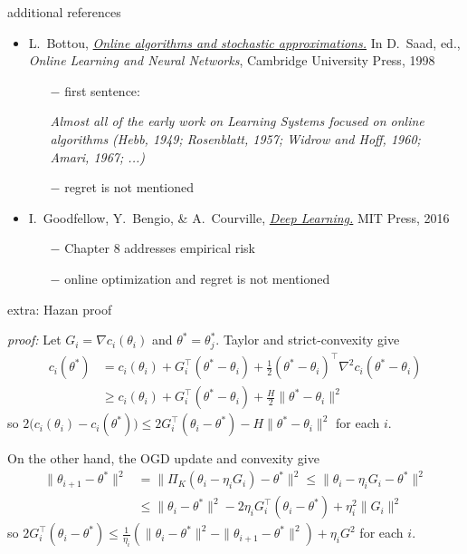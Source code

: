 \documentclass[xcolor={svgnames},
               hyperref={colorlinks,citecolor=DeepPink4,linkcolor=FireBrick,urlcolor=Maroon}]
               {beamer}
\newcommand{\grad}{\nabla}
\newcommand{\ds}{\displaystyle}
\begin{document}
\begin{frame}{additional references}

\begin{itemize}
\footnotesize
\item L.~Bottou, \href{http://leon.bottou.org/papers/bottou-98x}{\emph{Online algorithms and stochastic approximations.}}  In D.~Saad, ed., \emph{Online Learning and Neural Networks}, Cambridge University Press, 1998
    \begin{itemize}
    \scriptsize
    \item[$-$] first sentence:

\emph{Almost all of the early work on Learning Systems focused on online algorithms (Hebb, 1949; Rosenblatt, 1957; Widrow and Hoff, 1960; Amari, 1967; ...)}

    \item[$-$] regret is not mentioned
    \end{itemize}
\item I.~Goodfellow, Y.~Bengio, \& A.~Courville, \href{https://www.deeplearningbook.org/}{\emph{Deep Learning.}} MIT Press, 2016
    \begin{itemize}
    \scriptsize
    \item[$-$] Chapter 8 addresses empirical risk
    \item[$-$] online optimization and regret is not mentioned
    \end{itemize}
\end{itemize}
\end{frame}


\begin{frame}{extra: Hazan proof}

\noindent \emph{proof:}  Let $G_i = \grad c_i(\theta_i)$ and $\theta^*=\theta_j^*$.  Taylor and strict-convexity give
\begin{align*}
c_i(\theta^*) &= c_i(\theta_i) + G_i^\top (\theta^* - \theta_i) + \frac{1}{2} (\theta^* - \theta_i)^\top \grad^2 c_i (\theta^* - \theta_i) \\
    &\ge c_i(\theta_i) + G_i^\top (\theta^* - \theta_i) + \frac{H}{2} \|\theta^* - \theta_i\|^2
\end{align*}
so \quad $\ds 2 \big(c_i(\theta_i) - c_i(\theta^*)\big) \le 2 G_i^\top (\theta_i - \theta^*) - H \|\theta^* - \theta_i\|^2$ \quad for each $i$.

\medskip
\noindent On the other hand, the OGD update and convexity give
\begin{align*}
\|\theta_{i+1} - \theta^*\|^2 &= \|\Pi_K(\theta_i - \eta_i G_i) - \theta^*\|^2 \le \|\theta_i - \eta_i G_i - \theta^*\|^2 \\
    &\le \|\theta_i - \theta^*\|^2 - 2 \eta_i G_i^\top (\theta_i - \theta^*) + \eta_i^2 \|G_i\|^2
\end{align*}
so \quad $\ds 2 G_i^\top (\theta_i - \theta^*) \le \frac{1}{\eta_i} \left(\|\theta_i - \theta^*\|^2 - \|\theta_{i+1} - \theta^*\|^2\right) + \eta_i G^2$ \quad for each $i$.
\end{frame}
\end{document}
